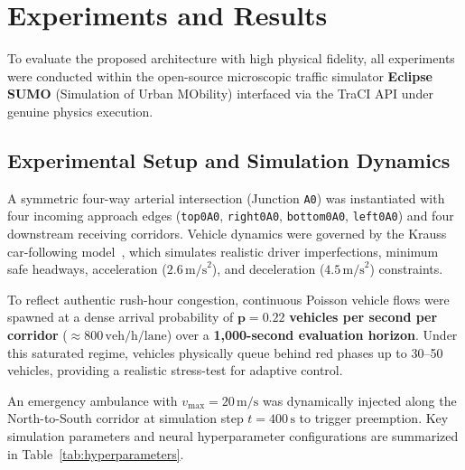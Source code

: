 \section{Experiments and Results}
\label{sec:experiments}

To evaluate the proposed architecture with high physical fidelity, all experiments were conducted within the open-source microscopic traffic simulator \textbf{Eclipse SUMO} (Simulation of Urban MObility) interfaced via the TraCI API under genuine physics execution.

\subsection{Experimental Setup and Simulation Dynamics}
A symmetric four-way arterial intersection (Junction \texttt{A0}) was instantiated with four incoming approach edges (\texttt{top0A0}, \texttt{right0A0}, \texttt{bottom0A0}, \texttt{left0A0}) and four downstream receiving corridors. Vehicle dynamics were governed by the Krauss car-following model~\cite{lopez2018microscopic}, which simulates realistic driver imperfections, minimum safe headways, acceleration ($2.6\,\text{m/s}^2$), and deceleration ($4.5\,\text{m/s}^2$) constraints.

To reflect authentic rush-hour congestion, continuous Poisson vehicle flows were spawned at a dense arrival probability of $\mathbf{p = 0.22}$ \textbf{vehicles per second per corridor} ($\approx 800\,\text{veh/h/lane}$) over a \textbf{1,000-second evaluation horizon}. Under this saturated regime, vehicles physically queue behind red phases up to 30--50 vehicles, providing a realistic stress-test for adaptive control.

An emergency ambulance with $v_{\max} = 20\,\text{m/s}$ was dynamically injected along the North-to-South corridor at simulation step $t = 400\,\text{s}$ to trigger preemption. Key simulation parameters and neural hyperparameter configurations are summarized in Table~\ref{tab:hyperparameters}.

